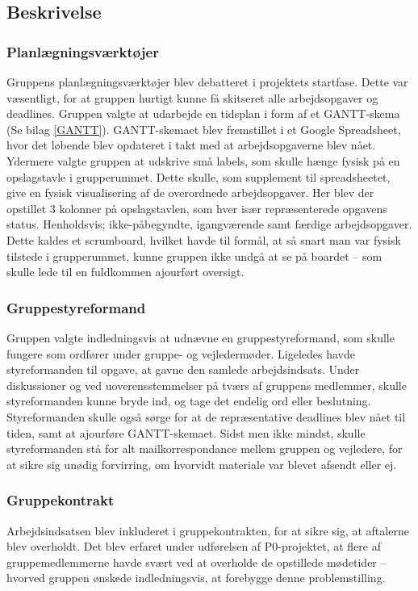 \subsection{Beskrivelse} %
\subsubsection{Planlægningsværktøjer}
Gruppens planlægningsværktøjer blev debatteret i projektets startfase. Dette var væsentligt, for at gruppen hurtigt kunne få skitseret alle arbejdsopgaver og deadlines. Gruppen valgte at udarbejde en tidsplan i form af et GANTT-skema (Se bilag \ref{GANTT}). GANTT-skemaet blev fremstillet i et Google Spreadsheet, hvor det løbende blev opdateret i takt med at arbejdsopgaverne blev nået. Ydermere valgte gruppen at udskrive små labels, som skulle hænge fysisk på en opslagstavle i grupperummet. Dette skulle, som supplement til spreadsheetet, give en fysisk visualisering af de overordnede arbejdsopgaver. Her blev der opstillet 3 kolonner på opslagstavlen, som hver især repræsenterede opgavens status. Henholdsvis; ikke-påbegyndte, igangværende samt færdige arbejdsopgaver. Dette kaldes et scrumboard, hvilket havde til formål, at så snart man var fysisk tilstede i grupperummet, kunne gruppen ikke undgå at se på boardet – som skulle lede til en fuldkommen ajourført oversigt. \\

\subsubsection{Gruppestyreformand}
Gruppen valgte indledningsvis at udnævne en gruppestyreformand, som skulle fungere som ordfører under gruppe- og vejledermøder. Ligeledes havde styreformanden til opgave, at gavne den samlede arbejdsindsats. Under diskussioner og ved uoverensstemmelser på tværs af gruppens medlemmer, skulle styreformanden kunne bryde ind, og tage det endelig ord eller beslutning. Styreformanden skulle også sørge for at de repræsentative deadlines blev nået til tiden, samt at ajourføre GANTT-skemaet. Sidst men ikke mindst, skulle styreformanden stå for alt mailkorrespondance mellem gruppen og vejledere, for at sikre sig unødig forvirring, om hvorvidt materiale var blevet afsendt eller ej. \\

\subsubsection{Gruppekontrakt}
Arbejdsindsatsen blev inkluderet i gruppekontrakten, for at sikre sig, at aftalerne blev overholdt. Det blev erfaret under udførelsen af P0-projektet, at flere af gruppemedlemmerne havde svært ved at overholde de opstillede mødetider – hvorved gruppen ønskede indledningsvis, at forebygge denne problemstilling. \\


